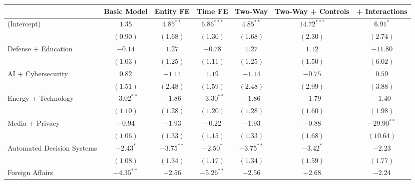 
\begin{table}
\begin{center}
\begin{tabular}{l c c c c c c}
\hline
 & Basic Model & Entity FE & Time FE & Two-Way & Two-Way + Controls & + Interactions \\
\hline
(Intercept)                                       & $1.35$       & $4.85^{**}$   & $6.86^{***}$  & $4.85^{**}$   & $14.72^{***}$ & $6.91^{*}$    \\
                                                  & $(0.90)$     & $(1.68)$      & $(1.30)$      & $(1.68)$      & $(2.30)$      & $(2.74)$      \\
Defense + Education                             & $-0.14$      & $1.27$        & $-0.78$       & $1.27$        & $1.12$        & $-11.80$      \\
                                                  & $(1.03)$     & $(1.25)$      & $(1.11)$      & $(1.25)$      & $(1.50)$      & $(6.02)$      \\
AI + Cybersecurity                              & $0.82$       & $-1.14$       & $1.19$        & $-1.14$       & $-0.75$       & $0.59$        \\
                                                  & $(1.51)$     & $(2.48)$      & $(1.59)$      & $(2.48)$      & $(2.99)$      & $(3.88)$      \\
Energy + Technology                             & $-3.02^{**}$ & $-1.86$       & $-3.30^{**}$  & $-1.86$       & $-1.79$       & $-1.40$       \\
                                                  & $(1.10)$     & $(1.28)$      & $(1.20)$      & $(1.28)$      & $(1.60)$      & $(1.98)$      \\
Media + Privacy                                 & $-0.94$      & $-1.93$       & $-0.22$       & $-1.93$       & $-0.88$       & $-29.90^{**}$ \\
                                                  & $(1.06)$     & $(1.33)$      & $(1.15)$      & $(1.33)$      & $(1.68)$      & $(10.64)$     \\
Automated Decision Systems                      & $-2.43^{*}$  & $-3.75^{**}$  & $-2.50^{*}$   & $-3.75^{**}$  & $-3.42^{*}$   & $-2.23$       \\
                                                  & $(1.08)$     & $(1.34)$      & $(1.17)$      & $(1.34)$      & $(1.59)$      & $(1.77)$      \\
Foreign Affairs                                 & $-4.35^{**}$ & $-2.56$       & $-5.26^{**}$  & $-2.56$       & $-2.68$       & $-2.24$       \\

\end{tabular}
\end{center}
\end{table}
